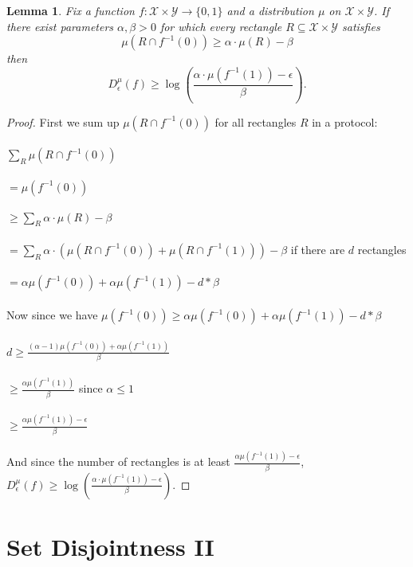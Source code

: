 \documentclass[11pt,oneside]{book}
\theoremstyle{plain}
\newtheorem{lemma}{Lemma}
\theoremstyle{definition}
\theoremstyle{plain}
\newcommand{\calX}{\mathcal{X}}
\newcommand{\calY}{\mathcal{Y}}
\begin{document}
\begin{lemma}
	Fix a function $f : \calX \times \calY \to \{0,1\}$ and a distribution
	$\mu$ on $\calX \times \calY$.
	If there exist parameters $\alpha, \beta > 0$ for which
	every rectangle $R \subseteq \calX \times \calY$ satisfies 
	\[
	\mu(R \cap f^{-1}(0)) \ge \alpha \cdot \mu(R) - \beta
	\]
	then
	\[
	D^\mu_\epsilon(f) \ge \log\left( \frac{\alpha \cdot \mu(f^{-1}(1)) - \epsilon}{\beta}\right).
	\]
\end{lemma}

\begin{proof}
	First we sum up $\mu(R \cap f^{-1}(0))$ for all rectangles $R$ in a protocol:\\
	\\
	$\sum_R\mu(R \cap f^{-1}(0))$\\
	\\
	$= \mu(f^{-1}(0))$\\
	\\
	$\ge \sum_R \alpha \cdot \mu(R) - \beta$\\
	\\
	$= \sum_R \alpha \cdot (\mu(R \cap f^{-1}(0))+\mu(R \cap f^{-1}(1))) - \beta $ if there are $d$ rectangles\\
	\\
	$= \alpha \mu(f^{-1}(0))+\alpha \mu(f^{-1}(1)) - d*\beta$\\
	\\
	Now since we have $\mu(f^{-1}(0)) \ge \alpha \mu(f^{-1}(0))+\alpha \mu(f^{-1}(1)) - d*\beta$ \\
	\\
	$d \ge \frac{(\alpha-1) \mu(f^{-1}(0))+\alpha \mu(f^{-1}(1))}{\beta}$\\
	\\
	$\ge \frac{\alpha \mu(f^{-1}(1))}{\beta}$ since $\alpha \leq 1$ \\
	\\
	$\ge \frac{\alpha \mu(f^{-1}(1))-\epsilon}{\beta}$\\
	\\
	And since the number of rectangles is at least $\frac{\alpha \mu(f^{-1}(1))-\epsilon}{\beta}$, $D^\mu_\epsilon(f) \ge \log\left( \frac{\alpha \cdot \mu(f^{-1}(1)) - \epsilon}{\beta}\right)$.
\end{proof}



 \section{Set Disjointness II}
\end{document}
